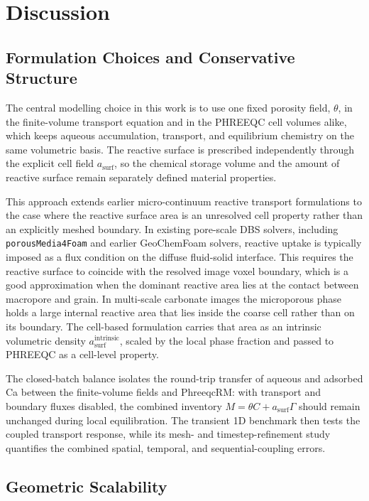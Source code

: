 \section{Discussion}

\subsection{Formulation Choices and Conservative Structure}

The central modelling choice in this work is to use one fixed porosity field,
$\theta$, in the finite-volume transport equation and in the PHREEQC cell
volumes alike, which keeps aqueous accumulation, transport, and equilibrium
chemistry on the same volumetric basis. The reactive surface is prescribed
independently through the explicit cell field $a_{\mathrm{surf}}$, so the
chemical storage volume and the amount of reactive surface remain separately
defined material properties.

This approach extends earlier micro-continuum reactive transport formulations
to the case where the reactive surface area is an unresolved cell property
rather than an explicitly meshed boundary. In existing pore-scale DBS solvers,
including \nolinkurl{porousMedia4Foam} and earlier GeoChemFoam solvers,
reactive uptake is typically imposed as a flux condition on the diffuse
fluid-solid interface. This requires the reactive surface to coincide with the resolved image voxel
boundary, which is a good approximation when the dominant reactive area lies at
the contact between macropore and grain. In multi-scale carbonate images the
microporous phase holds a large internal reactive area that lies inside the
coarse cell rather than on its boundary. The cell-based formulation carries
that area as an intrinsic volumetric density
$a_{\mathrm{surf}}^{\mathrm{intrinsic}}$, scaled by the local phase fraction
and passed to PHREEQC as a cell-level property.

The closed-batch balance isolates the round-trip transfer of aqueous and
adsorbed Ca between the finite-volume fields and PhreeqcRM: with transport and
boundary fluxes disabled, the combined inventory
$M=\theta C+a_{\mathrm{surf}}\Gamma$ should remain unchanged during local
equilibration. The transient 1D benchmark then tests the coupled transport
response, while its mesh- and timestep-refinement study quantifies the combined
spatial, temporal, and sequential-coupling errors.

\subsection{Geometric Scalability}

